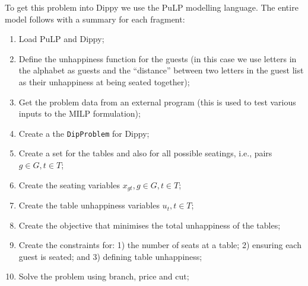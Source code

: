 To get this problem into Dippy we use the PuLP modelling language. The entire model follows with a summary for each fragment:
\begin{enumerate}
\item Load PuLP and Dippy;


\item Define the unhappiness function for the guests (in this case we use letters in the alphabet as guests and the ``distance'' between two letters in the guest list as their unhappiness at being seated together);


\item Get the problem data from an external program  (this is used to test various inputs to the \ac{MILP} formulation);


\item Create a the \texttt{DipProblem} for Dippy;


\item Create a set for the tables and also for all possible seatings, i.e., pairs $g \in G, t \in T$;


\newpage

\item Create the seating variables $x_{gt}, g \in G, t \in T$;


\item Create the table unhappiness variables $u_t, t \in T$;


\item Create the objective that minimises the total unhappiness of the tables;


\item Create the constraints for: 1) the number of seats at a table; 2) ensuring each guest is seated; and 3) defining table unhappiness;



\newpage

\item Solve the problem using branch, price and cut;


\end{enumerate}

